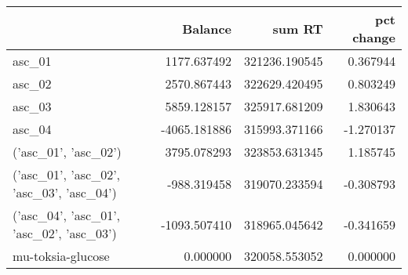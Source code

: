 \begin{tabular}{lrrr}
\toprule
{} &      Balance &         sum RT &  pct change \\
\midrule
asc\_01                                   &  1177.637492 &  321236.190545 &    0.367944 \\
asc\_02                                   &  2570.867443 &  322629.420495 &    0.803249 \\
asc\_03                                   &  5859.128157 &  325917.681209 &    1.830643 \\
asc\_04                                   & -4065.181886 &  315993.371166 &   -1.270137 \\
('asc\_01', 'asc\_02')                     &  3795.078293 &  323853.631345 &    1.185745 \\
('asc\_01', 'asc\_02', 'asc\_03', 'asc\_04') &  -988.319458 &  319070.233594 &   -0.308793 \\
('asc\_04', 'asc\_01', 'asc\_02', 'asc\_03') & -1093.507410 &  318965.045642 &   -0.341659 \\
mu-toksia-glucose                        &     0.000000 &  320058.553052 &    0.000000 \\
\bottomrule
\end{tabular}
